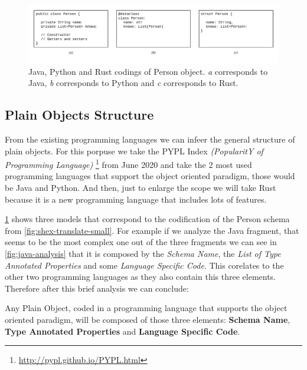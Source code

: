 \begin{figure}
    \includegraphics[width=\textwidth]{images/codings-exmaple.png}
    \centering
    \caption[Java, Python and Rust codings of Person object.]{Java, Python and Rust codings of Person object. 
    \textit{a} corresponds to Java, \textit{b} corresponds to Python and \textit{c} corresponds to Rust.}
    \label{fig:person-codings}
\end{figure}


\subsection{Plain Objects Structure}
From the existing programming languages we can infeer the general structure of plain objects. For this porpuse
we take the PYPL Index \textit{(PopularitY of Programming Language)} \footnote{\url{http://pypl.github.io/PYPL.html}}
from June 2020 and take the 2 most used programming languages that support the object oriented paradigm,
those would be Java and Python. And then, just to enlarge the scope we will take Rust because it is a new programming
language that includes lots of features.

\cref{fig:person-codings} shows three models that correspond to the codification of the Person schema from
\cref{fig:shex-translate-small}. For example if we analyze the Java fragment, that seems to be the most complex
one out of the three fragments we can see in \cref{fig:java-analysis} that it is composed by the \textit{Schema Name},
the \textit{List of Type Annotated Properties} and some \textit{Language Specific Code}. This corelates to the other
two programming languages as they also contain this three elements. Therefore after this brief analysis we can conclude:

\begin{partconclusion}
    Any Plain Object, coded in a programming language that supports the object oriented paradigm, will be composed of
    those three elements: \textbf{Schema Name}, \textbf{Type Annotated Properties} and \textbf{Language Specific Code}.
\end{partconclusion}

